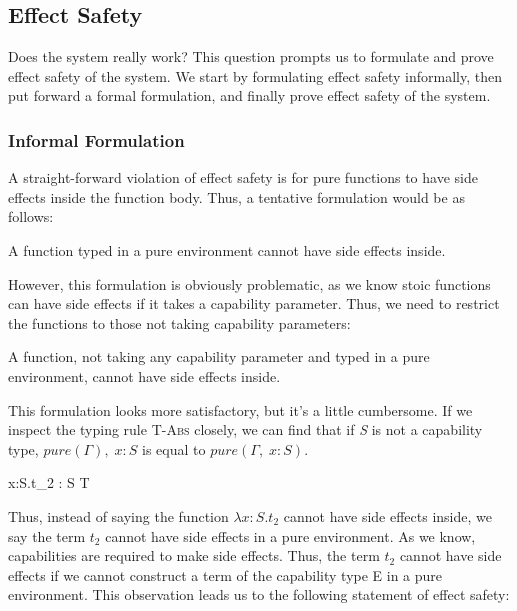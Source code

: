 \subsection{Effect Safety}

Does the system really work? This question prompts us to formulate and
prove effect safety of the system. We start by formulating effect
safety informally, then put forward a formal formulation, and finally
prove effect safety of the system.

\subsubsection{Informal Formulation}

A straight-forward violation of effect safety is for pure functions to
have side effects inside the function body. Thus, a tentative
formulation would be as follows:

\begin{definition}
A function typed in a pure environment cannot have side effects inside.
\end{definition}

However, this formulation is obviously problematic, as we know stoic
functions can have side effects if it takes a capability
parameter. Thus, we need to restrict the functions to those not taking
capability parameters:

\begin{definition}
  A function, not taking any capability parameter and typed in a pure
  environment, cannot have side effects inside.
\end{definition}

This formulation looks more satisfactory, but it's a little
cumbersome. If we inspect the typing rule \textsc{T-Abs} closely, we
can find that if \emph{S} is not a capability type,
$pure(\Gamma),\; x: S$ is equal to $pure(\Gamma,\; x: S)$.

{ \Gamma \vdash \lambda x:S.\;t_2 : S \to T }

Thus, instead of saying the function $\lambda x:S.t_2$ cannot have
side effects inside, we say the term $t_2$ cannot have side effects in
a pure environment. As we know, capabilities are required to make side
effects. Thus, the term $t_2$ cannot have side effects if we cannot
construct a term of the capability type E in a pure environment. This
observation leads us to the following statement of effect safety:

